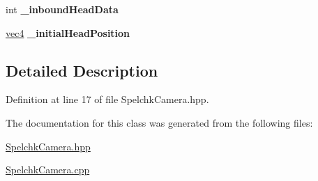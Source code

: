 \begin{DoxyCompactItemize}
\item 
\hypertarget{class_spelchk_camera_a4d0112ca90bced7facf868165b109f2c}{int {\bfseries \-\_\-inbound\-Head\-Data}}\label{class_spelchk_camera_a4d0112ca90bced7facf868165b109f2c}

\item 
\hypertarget{class_spelchk_camera_a92d895ed8ba20382bcf9000acb8f62c4}{\hyperlink{struct_angel_1_1vec4}{vec4} {\bfseries \-\_\-initial\-Head\-Position}}\label{class_spelchk_camera_a92d895ed8ba20382bcf9000acb8f62c4}

\end{DoxyCompactItemize}


\subsection{Detailed Description}


Definition at line 17 of file Spelchk\-Camera.\-hpp.



The documentation for this class was generated from the following files\-:\begin{DoxyCompactItemize}
\item 
\hyperlink{_spelchk_camera_8hpp}{Spelchk\-Camera.\-hpp}\item 
\hyperlink{_spelchk_camera_8cpp}{Spelchk\-Camera.\-cpp}\end{DoxyCompactItemize}

